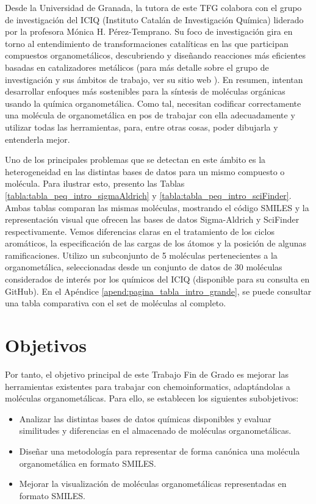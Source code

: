 Desde la Universidad de Granada, la tutora de este TFG colabora con el grupo de investigación del ICIQ (Instituto Catalán de Investigación Química) liderado por la profesora Mónica H. Pérez-Temprano. Su foco de investigación gira en torno al entendimiento de transformaciones catalíticas en las que participan compuestos organometálicos, descubriendo y diseñando reacciones más eficientes basadas en catalizadores metálicos (para más detalle sobre el grupo de investigación y sus ámbitos de trabajo, ver su sitio web \cite{ICIQ}). En resumen, intentan desarrollar enfoques más sostenibles para la síntesis de moléculas orgánicas usando la química organometálica. Como tal, necesitan codificar correctamente una molécula de organometálica en pos de trabajar con ella adecuadamente y utilizar todas las herramientas, para, entre otras cosas, poder dibujarla y entenderla mejor.


Uno de los principales problemas que se detectan en este ámbito es la heterogeneidad en las distintas bases de datos para un mismo compuesto o molécula. Para ilustrar esto, presento las Tablas \ref{tabla:tabla_peq_intro_sigmaAldrich} y \ref{tabla:tabla_peq_intro_sciFinder}. Ambas tablas comparan las mismas moléculas, mostrando el código SMILES y la representación visual que ofrecen las bases de datos Sigma-Aldrich y SciFinder respectivamente. Vemos diferencias claras en el tratamiento de los ciclos aromáticos, la especificación de las cargas de los átomos y la posición de algunas ramificaciones. Utilizo un subconjunto de 5 moléculas pertenecientes a la organometálica, seleccionadas desde un conjunto de datos de 30 moléculas considerados de interés por los químicos del ICIQ (disponible para su consulta en GitHub). En el Apéndice \ref{apend:pagina_tabla_intro_grande}, se puede consultar una tabla comparativa con el set de moléculas al completo. 





\section{Objetivos}
Por tanto, el objetivo principal de este Trabajo Fin de Grado es mejorar las herramientas existentes para trabajar con chemoinformatics, adaptándolas a moléculas organometálicas. Para ello, se establecen los siguientes subobjetivos:
\begin{itemize}
    \item Analizar las distintas bases de datos químicas disponibles y evaluar similitudes y diferencias en el almacenado de moléculas organometálicas.
    \item Diseñar una metodología para representar de forma canónica una molécula organometálica en formato SMILES.
    \item Mejorar la visualización de moléculas organometálicas representadas en formato SMILES.
\end{itemize} 

